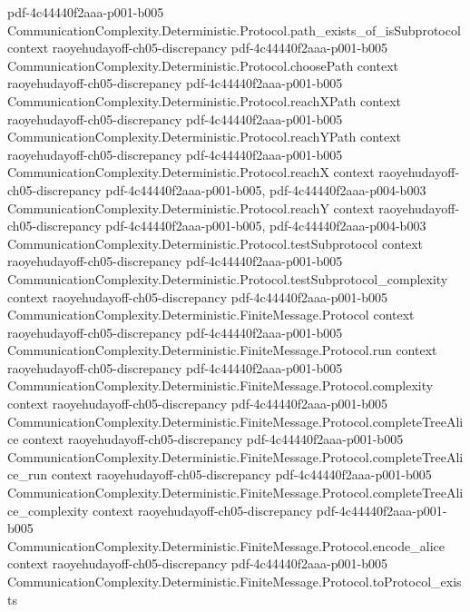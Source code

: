 \begin{lemma}
  {pdf-4c44440f2aaa-p001-b005}
\proofstep
  {CommunicationComplexity.Deterministic.Protocol.path_exists_of_isSubprotocol}
  {context}
  {raoyehudayoff-ch05-discrepancy}
  {pdf-4c44440f2aaa-p001-b005}
\proofstep
  {CommunicationComplexity.Deterministic.Protocol.choosePath}
  {context}
  {raoyehudayoff-ch05-discrepancy}
  {pdf-4c44440f2aaa-p001-b005}
\proofstep
  {CommunicationComplexity.Deterministic.Protocol.reachXPath}
  {context}
  {raoyehudayoff-ch05-discrepancy}
  {pdf-4c44440f2aaa-p001-b005}
\proofstep
  {CommunicationComplexity.Deterministic.Protocol.reachYPath}
  {context}
  {raoyehudayoff-ch05-discrepancy}
  {pdf-4c44440f2aaa-p001-b005}
\proofstep
  {CommunicationComplexity.Deterministic.Protocol.reachX}
  {context}
  {raoyehudayoff-ch05-discrepancy}
  {pdf-4c44440f2aaa-p001-b005,
    pdf-4c44440f2aaa-p004-b003}
\proofstep
  {CommunicationComplexity.Deterministic.Protocol.reachY}
  {context}
  {raoyehudayoff-ch05-discrepancy}
  {pdf-4c44440f2aaa-p001-b005,
    pdf-4c44440f2aaa-p004-b003}
\proofstep
  {CommunicationComplexity.Deterministic.Protocol.testSubprotocol}
  {context}
  {raoyehudayoff-ch05-discrepancy}
  {pdf-4c44440f2aaa-p001-b005}
\proofstep
  {CommunicationComplexity.Deterministic.Protocol.testSubprotocol_complexity}
  {context}
  {raoyehudayoff-ch05-discrepancy}
  {pdf-4c44440f2aaa-p001-b005}
\proofstep
  {CommunicationComplexity.Deterministic.FiniteMessage.Protocol}
  {context}
  {raoyehudayoff-ch05-discrepancy}
  {pdf-4c44440f2aaa-p001-b005}
\proofstep
  {CommunicationComplexity.Deterministic.FiniteMessage.Protocol.run}
  {context}
  {raoyehudayoff-ch05-discrepancy}
  {pdf-4c44440f2aaa-p001-b005}
\proofstep
  {CommunicationComplexity.Deterministic.FiniteMessage.Protocol.complexity}
  {context}
  {raoyehudayoff-ch05-discrepancy}
  {pdf-4c44440f2aaa-p001-b005}
\proofstep
  {CommunicationComplexity.Deterministic.FiniteMessage.Protocol.completeTreeAlice}
  {context}
  {raoyehudayoff-ch05-discrepancy}
  {pdf-4c44440f2aaa-p001-b005}
\proofstep
  {CommunicationComplexity.Deterministic.FiniteMessage.Protocol.completeTreeAlice_run}
  {context}
  {raoyehudayoff-ch05-discrepancy}
  {pdf-4c44440f2aaa-p001-b005}
\proofstep
  {CommunicationComplexity.Deterministic.FiniteMessage.Protocol.completeTreeAlice_complexity}
  {context}
  {raoyehudayoff-ch05-discrepancy}
  {pdf-4c44440f2aaa-p001-b005}
\proofstep
  {CommunicationComplexity.Deterministic.FiniteMessage.Protocol.encode_alice}
  {context}
  {raoyehudayoff-ch05-discrepancy}
  {pdf-4c44440f2aaa-p001-b005}
\proofstep
  {CommunicationComplexity.Deterministic.FiniteMessage.Protocol.toProtocol_exists}

\end{lemma}
